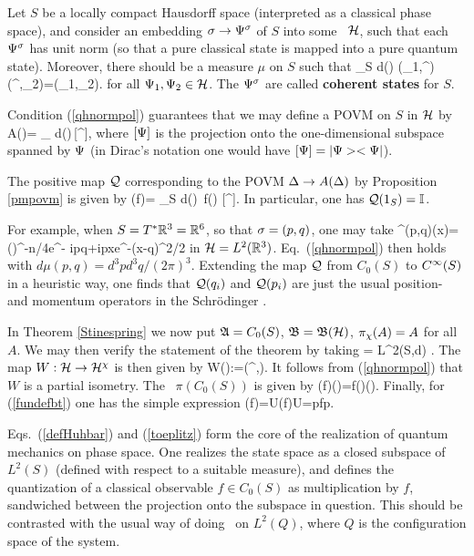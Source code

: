 Let $S$ be a locally compact Hausdorff space (interpreted as a
classical phase space), and consider an embedding $\sigma\rightarrow\Psi^{\sigma}$
of $S$ into some \Hs\ ${\cal H}$, such that each $\Psi^{\sigma}$ has unit norm
(so that a pure classical state is mapped into a pure quantum
state). Moreover, there should be a measure $\mu$ on $S$ such that \be
\int_S d\mu(\sg) (\Ps_1,\Ps^{\sg}) (\Ps^{\sg},\Ps_2)=(\Ps_1,\Ps_2).
 \ee for all $\Psi_1,\Psi_2\in{\cal H}$.  The $\Psi^{\sigma}$ are
called {\bf coherent states} for $S$.

Condition (\ref{qhnormpol}) guarantees that we may define a POVM on $S$ in ${\cal H}$
by
\be
A(\Dl)= \int_{\Dl}  d\mu(\sg)\,[\Ps^{\sg}], 
\ee
where $[\Psi]$ is the projection onto the one-dimensional subspace spanned
by $\Psi$ (in Dirac's notation one would have $[\Psi]=|\Psi><\Psi|$).

The positive map ${\cal Q}$ corresponding to the POVM $\Delta\rightarrow A(\Delta)$ by Proposition \ref{pmpovm}
is given by
\be
\CQ(f)= \int_{S}  d\mu(\sg)\, f(\sg) [\Ps^{\sg}].
\ee
  In particular, one has ${\cal Q}(1_S)={\Bbb I}$. 

For example, when $S=T^*{\Bbb R}^3={\Bbb R}^6$, so that $\sigma=(p,q)$, one may take 
\be
\Ps^{(p,q)}(x)=(\pi)^{-n/4}e^{-\half
ipq+ipx}e^{-(x-q)^2/2} 
\ee
in ${\cal H}=L^2({\Bbb R}^3)$.
Eq.\ (\ref{qhnormpol})  then holds with $d\mu(p,q)=d^3pd^3q/(2\pi)^3$. 
 Extending the map ${\cal Q}$ from $C_0(S)$ to $C^{\infty}(S)$ in a heuristic way, one finds that 
${\cal Q}(q_i)$
and ${\cal Q}(p_i)$ are just the usual position- and momentum operators in the Schr\"{o}dinger \rep.

In Theorem \ref{Stinespring} we now put ${\frak A}=C_0(S)$, ${\frak B}={\frak B}({\cal H})$, $\pi_{\chi}(A)=A$ for all $A$.
We may then verify the statement of the theorem by taking
\be 
\Hug= L^2(S,d\mu) .
\ee 
The map $W:{\cal H}\rightarrow{\cal H}^{\chi}$ is then given by 
\be 
W\Ps(\sg):=(\Ps^{\sg},\Ps).   
\ee 
It follows from
(\ref{qhnormpol}) that $W$ is a partial isometry.
The \rep\ $\pi(C_0(S))$ is  given by
\be
\pi(f)\Ph(\sg)=f(\sg)\Ph(\sg).
\ee
 Finally, for (\ref{fundefbt}) one has the simple expression
\be
\til{\CQ}(f)=U\CQ(f)U\inv=pfp.
\ee

Eqs.\ (\ref{defHuhbar}) and (\ref{toeplitz}) form the core of 
the realization of quantum
mechanics on phase space. One realizes the state space as a closed
subspace of $L^2(S)$ (defined with respect to a suitable 
 measure), and defines the quantization of a
classical observable $f\in C_0(S)$ as multiplication by $f$, 
sandwiched between the projection onto the subspace in question.
This should be contrasted with the usual way of doing \qm\ on $L^2(Q)$, where $Q$ is
the configuration space of the system.
 
